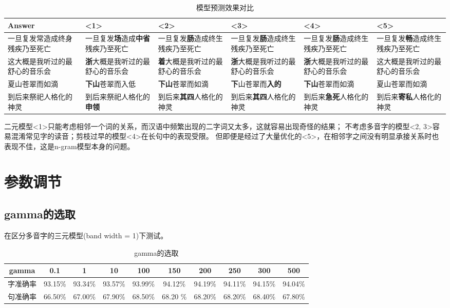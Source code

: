 \documentclass[12pt, UTF8, a4paper]{ctexart}
\begin{document}
\begin{table}[htbp] 
    \caption{\label{tab:4}模型预测效果对比}
    \footnotesize
    \centering
    \begin{tabular}{p{60pt}p{60pt}p{60pt}p{60pt}p{60pt}p{60pt}}
    \toprule
    Answer & <1> & <2> & <3> & <4> & <5>\\
    \midrule
    一旦复发常造成终身残疾乃至死亡 & 一旦复发\textbf{场}造成\textbf{中省}残疾乃至死亡 & 一旦复发\textbf{肠}造成终生残疾乃至死亡 
    & 一旦复发\textbf{肠}造成终生残疾乃至死亡 & 一旦复发\textbf{肠}造成终生残疾乃至死亡 & 一旦复发\textbf{畅}造成终生残疾乃至死亡\\
    这大概是我听过的最舒心的音乐会 & \textbf{浙}大概是我听过的最舒心的音乐会     & \textbf{着}大概是我听过的最舒心的音乐会 
    & \textbf{浙}大概是我听过的最舒心的音乐会 & \textbf{浙}大概是我听过的最舒心的音乐会 & 这大概是我听过的最舒心的音乐会\\
    夏山苍翠而如滴                 & \textbf{下山}苍翠而入低                     & \textbf{下山}苍翠而如滴
    & \textbf{下}山苍翠而\textbf{入的}             & \textbf{下山}苍翠而如滴                 & 夏山苍翠而如滴\\
    到后来祭祀人格化的神灵         & 到后来祭祀人格化的\textbf{申领}             & 到后来\textbf{其四}人格化的神灵
    & 到后来\textbf{其四}人格化的神灵         & 到后来\textbf{急死}人格化的神灵         & 到后来\textbf{寄私}人格化的神灵\\
    \bottomrule
    \end{tabular}
\end{table}

二元模型<1>只能考虑相邻一个词的关系，而汉语中频繁出现的二字词又太多，这就容易出现奇怪的结果；
不考虑多音字的模型<2, 3>容易混淆常见字的读音；剪枝过早的模型<4>在长句中的表现受限。
但即便是经过了大量优化的<5>，在相邻字之间没有明显承接关系时也表现不佳，这是n-gram模型本身的问题。


\section{参数调节}

\subsection{gamma的选取}

在区分多音字的三元模型(band width = 1)下测试。

\begin{table}[htbp] 
    \caption{\label{tab:5}gamma的选取} 
    \centering
    \footnotesize
    \begin{tabular}{cccccccccc} 
     \toprule 
     gamma    & 0.1     & 1       & 10      & 100     & 
     150     & 200     & 250    & 300     & 500\\
    \midrule
     字准确率 & 93.15\% & 93.34\% & 93.57\% & 93.99\% & 
     94.12\% & 94.19\% & 94.11\% & 94.15\% & 94.04\%\\
     句准确率 & 66.50\% & 67.00\% & 67.90\% & 68.50\% & 
     68.20 \% & 68.20\% & 68.20\% & 68.40\% & 67.80\%\\
     \bottomrule 
    \end{tabular}
\end{table}
\end{document}
